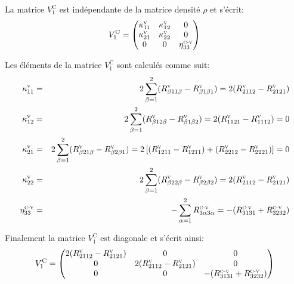 \documentclass[12pt,a4paper,openany,oneside]{book}
\begin{document}
{{{{La matrice $ V_{1}^{\textrm{C}} $ est indépendante de la matrice densité $\rho$ et s'écrit:
\renewcommand{\arraystretch}{2}
 $$
   V_{1}^{\textrm{C}} = \begin{pmatrix}
                  \kappa^{\textsc{v}}_{11} & \kappa^{\textsc{v}}_{12} & 0\\
                  \kappa^{\textsc{v}}_{21} & \kappa^{\textsc{v}}_{22} & 0\\
                                         0 & 0                        & \eta^{\textsc{c-v}}_{33}
         \end{pmatrix} \\
$$
\renewcommand{\arraystretch}{1}
 {\setlength{\jot}{0.35cm}
Les éléments de la matrice $ V_{1}^{\textrm{C}} $ sont calculés comme suit:
\begin{eqnarray*}
 \kappa^{\textsc{v}}_{11} & = & 2\displaystyle\sum_{\beta=1}^{2}(R^{\textsc{v}}_{\beta 11 \beta}-R^{\textsc{v}}_{\beta 1 \beta 1})  = 2(R^{\textsc{v}}_{2112}-R^{\textsc{v}}_{2121}) \\  
\kappa^{\textsc{v}}_{12} & = & 2\displaystyle\sum_{\beta=1}^{2}(R^{\textsc{v}}_{\beta 12 \beta}-R^{\textsc{v}}_{\beta 1 \beta 2})= 2(R^{\textsc{v}}_{1121}-R^{\textsc{v}}_{1112})= 0 \\
 \kappa^{\textsc{v}}_{21}& = & 2\displaystyle\sum_{\beta=1}^{2}(R^{\textsc{v}}_{\beta 21 \beta}-R^{\textsc{v}}_{\beta 2\beta 1})= 2\left[(R^{\textsc{v}}_{1211}-R^{\textsc{v}}_{1211})+(R^{\textsc{v}}_{2212}-R^{\textsc{v}}_{2221}) \right]=0 \\
\kappa^{\textsc{v}}_{22}& = & 2\displaystyle\sum_{\beta=1}^{2}(R^{\textsc{v}}_{\beta 22 \beta}-R^{\textsc{v}}_{\beta 2\beta 2}) = 2(R^{\textsc{v}}_{2112}-R^{\textsc{v}}_{2121}) \\
\eta^{\textsc{c-v}}_{33}& = & -\displaystyle\sum_{\alpha=1}^{2}R^{\textsc{c-v}}_{3 \alpha 3 \alpha}= -(R^{\textsc{c-v}}_{3131}+R^{\textsc{c-v}}_{3232})  
\end{eqnarray*}             
 
Finalement la matrice $ V_{1}^{\textrm{C}} $ est diagonale et s'écrit ainsi:
\renewcommand{\arraystretch}{2}
\begin{equation}
 V_{1}^{\textrm{C}} = \begin{pmatrix}
         2(R^{\textsc{v}}_{2112}-R^{\textsc{v}}_{2121}) &                   0                            & 0\\
                                   0                    & 2(R^{\textsc{v}}_{2112}-R^{\textsc{v}}_{2121}) & 0\\
                                   0                    & 0  & -(R^{\textsc{c-v}}_{3131}+R^{\textsc{c-v}}_{3232}) 
         \end{pmatrix}
\end{equation}
\renewcommand{\arraystretch}{1}\\

}}}}}
\end{document}
